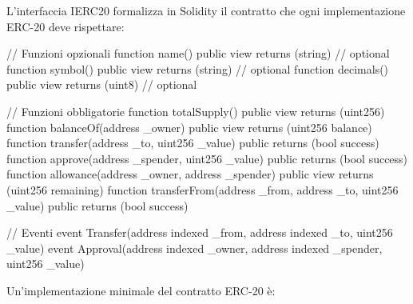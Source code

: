 \documentclass[
  italian,
  openany]{book}
\newenvironment{Shaded}{\begin{snugshade}}{\end{snugshade}}
\newcommand{\NormalTok}[1]{#1}
\begin{document}
L'interfaccia IERC20 formalizza in Solidity il contratto che ogni
implementazione ERC-20 deve rispettare:

\begin{Shaded}
\begin{Highlighting}[]
\NormalTok{// Funzioni opzionali}
\NormalTok{function name()     public view returns (string)  // optional}
\NormalTok{function symbol()   public view returns (string)  // optional}
\NormalTok{function decimals() public view returns (uint8)   // optional}

\NormalTok{// Funzioni obbligatorie}
\NormalTok{function totalSupply() public view returns (uint256)}
\NormalTok{function balanceOf(address \_owner) public view returns (uint256 balance)}
\NormalTok{function transfer(address \_to, uint256 \_value) public returns (bool success)}
\NormalTok{function approve(address \_spender, uint256 \_value) public returns (bool success)}
\NormalTok{function allowance(address \_owner, address \_spender) public view returns (uint256 remaining)}
\NormalTok{function transferFrom(address \_from, address \_to, uint256 \_value) public returns (bool success)}

\NormalTok{// Eventi}
\NormalTok{event Transfer(address indexed \_from, address indexed \_to, uint256 \_value)}
\NormalTok{event Approval(address indexed \_owner, address indexed \_spender, uint256 \_value)}
\end{Highlighting}
\end{Shaded}

Un'implementazione minimale del contratto ERC-20 è:
\end{document}

